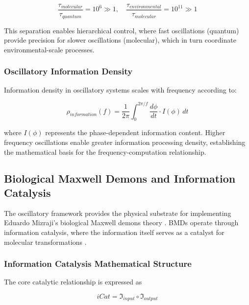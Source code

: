 \documentclass[12pt,a4paper]{article}
\begin{document}
\begin{equation}
\frac{\tau_{molecular}}{\tau_{quantum}} = 10^{6} \gg 1, \quad \frac{\tau_{environmental}}{\tau_{molecular}} = 10^{11} \gg 1
\end{equation}

This separation enables hierarchical control, where fast oscillations (quantum) provide precision for slower oscillations (molecular), which in turn coordinate environmental-scale processes.

\subsubsection{Oscillatory Information Density}

Information density in oscillatory systems scales with frequency according to:

\begin{equation}
\rho_{information}(f) = \frac{1}{2\pi} \int_0^{2\pi/f} \frac{d\phi}{dt} \cdot I(\phi) \, dt
\end{equation}

where $I(\phi)$ represents the phase-dependent information content. Higher frequency oscillations enable greater information processing density, establishing the mathematical basis for the frequency-computation relationship.



\subsection{Biological Maxwell Demons and Information Catalysis}

The oscillatory framework provides the physical substrate for implementing Eduardo Mizraji's biological Maxwell demons theory \cite{mizraji2007biological}. BMDs operate through information catalysis, where the information itself serves as a catalyst for molecular transformations \cite{mizraji2007biological}.

\subsubsection{Information Catalysis Mathematical Structure}

The core catalytic relationship is expressed as

\begin{equation}
iCat = \mathfrak{I}_{input} \circ \mathfrak{I}_{output}
\end{equation}
\end{document}
